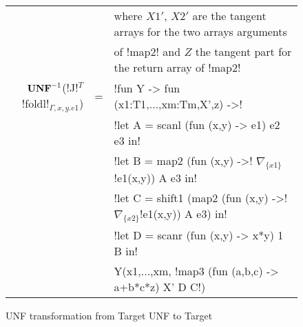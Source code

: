 \begin{figure*}[t]
\begin{tabular}{r c l}
    && where $X1'$, $X2'$ are the tangent arrays for the two arrays arguments \\
    && of !map2! and $Z$ the tangent part for the return array of !map2! \\
    $\mathbf{UNF}^{-1}$(!J!$^T$!foldl!$_{\Gamma,x,y.e1}$) &=&  !fun Y -> fun (x1:T1,...,xm:Tm,X',z) ->!\\
    && !let A = scanl (fun (x,y) -> e1) e2 e3 in! \\
    && !let B = map2 (fun (x,y) ->! $\nabla_{\{x1\}}$!e1(x,y)) A e3 in!\\
    && !let C = shift1 (map2 (fun (x,y) ->! $\nabla_{\{x2\}}$!e1(x,y)) A e3) in!\\
    && !let D = scanr (fun (x,y) -> x*y) 1 B in!\\
    && Y(x1,...,xm, !map3 (fun (a,b,c) -> a+b*c*z) X' D C!)
    \end{tabular}
    \caption{UNF transformation from Target UNF to Target}
    \label{fig:unf_to_target}
    \end{figure*}